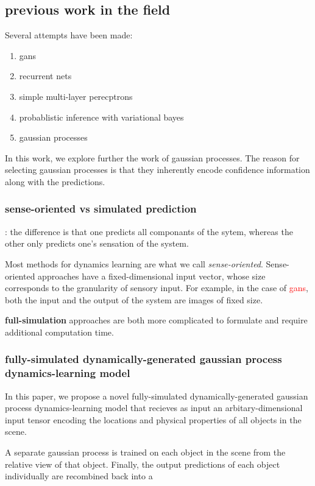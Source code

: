 \documentclass[11pt]{article}
\newcommand\later[1]{\textcolor{red}{#1}}
\begin{document}
\subsection{previous work in the field}
Several attempts have been made:
\begin{enumerate}
\item gans
\item recurrent nets
\item simple multi-layer perecptrons
\item probablistic inference with variational bayes
  \item gaussian processes
\end{enumerate}

In this work, we explore further the work of gaussian processes. The reason for selecting
gaussian processes is that they inherently encode confidence information along with the
predictions.

\subsubsection{sense-oriented vs simulated prediction}:
the difference is that one predicts all componants of the sytem, whereas the other only
predicts one's sensation of the system.

Most methods for dynamics learning are what we call \textit{sense-oriented}. Sense-oriented
approaches have a fixed-dimensional input vector, whose size corresponds to the granularity
of sensory input. For example, in the case of \later{gans}, both the input and the output
of the system are images of fixed size.

\textbf{full-simulation} approaches are both more complicated to formulate and require
additional computation time.



\subsubsection{fully-simulated dynamically-generated gaussian process
dynamics-learning model}
In this paper, we propose a novel fully-simulated dynamically-generated gaussian process
dynamics-learning model that recieves as input an arbitary-dimensional input tensor
encoding the locations and physical properties of all objects in the scene.

A separate gaussian process is trained on each object in the scene from the relative view
of that object. Finally, the output predictions of each object individually are recombined
back into a
\end{document}
